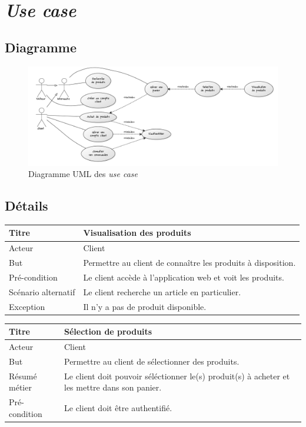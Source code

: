 \documentclass[12pt]{article}
\newcommand\addrow[2]{#1 &#2\\ }
\newcommand\addheading[2]{\textbf{#1} &#2\\ \hline}
\newcommand\tabularhead{\begin{tabular}{lp{11cm}}
\hline
}
\newenvironment{usecase}{\tabularhead}
{\hline\end{tabular}}
\begin{document}
\newpage
\section{\textit{Use case}}

\subsection{Diagramme}

\begin{figure}[ht]
    \center
    \includegraphics[scale=0.33]{../Diagrams/UseCaseDiagrams/usecase_global.png}
    \caption*{Diagramme UML des \textit{use case}}
\end{figure}

\subsection{Détails}

\begin{usecase}
    \addheading{Titre}{Visualisation des produits}
    \addrow{Acteur}{Client}
    \addrow{But}{Permettre au client de connaître les produits à disposition.}
    \addrow{Pré-condition}{Le client accède à l'application web et voit les produits.}
    \addrow{Scénario alternatif}{Le client recherche un article en particulier.}
    \addrow{Exception}{Il n'y a pas de produit disponible.}
\end{usecase}

\begin{usecase}
    \addheading{Titre}{Sélection de produits}
    \addrow{Acteur}{Client}
    \addrow{But}{Permettre au client de sélectionner des produits.}
    \addrow{Résumé métier}{Le client doit pouvoir séléctionner le(s) produit(s) à acheter et les mettre dans son panier.}
    \addrow{Pré-condition}{Le client doit être authentifié.}
\end{usecase}
\end{document}
